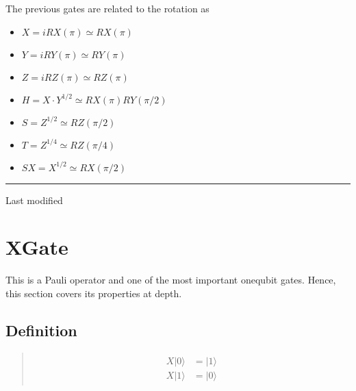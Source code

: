 \documentclass[letterpaper,10pt,english]{jupyterBook}
\begin{document}
\sphinxAtStartPar
The previous gates are related to the rotation as
\begin{itemize}
\item {}
\sphinxAtStartPar
\(X = i RX(\pi) \simeq RX(\pi)\)

\item {}
\sphinxAtStartPar
\(Y = i RY(\pi) \simeq RY(\pi)\)

\item {}
\sphinxAtStartPar
\(Z = i RZ(\pi) \simeq RZ(\pi)\)

\item {}
\sphinxAtStartPar
\(H = X \cdot Y^{1/2} \simeq RX(\pi) RY(\pi/2)\)

\item {}
\sphinxAtStartPar
\(S = Z^{1/2} \simeq RZ(\pi/2)\)

\item {}
\sphinxAtStartPar
\(T = Z^{1/4} \simeq RZ(\pi/4)\)

\item {}
\sphinxAtStartPar
\(SX = X^{1/2} \simeq RX(\pi/2)\)

\end{itemize}


\bigskip\hrule\bigskip


\sphinxAtStartPar
Last modified

\sphinxstepscope


\section{XGate}
\label{\detokenize{q1gates/x:xgate}}\label{\detokenize{q1gates/x:sec-xgate}}\label{\detokenize{q1gates/x::doc}}
\sphinxAtStartPar
This is a Pauli operator and one of the most important one\sphinxhyphen{}qubit gates.  Hence, this section covers its properties at depth.

\sphinxAtStartPar
{}


\subsection{Definition}
\label{\detokenize{q1gates/x:definition}}
\sphinxAtStartPar
{}
\begin{quote}
\begin{equation}\label{equation:q1gates/x:XGate}
\begin{split}
\begin{align}
X |0\rangle &= |1\rangle\\
X |1\rangle &= |0\rangle
\end{align}
\end{split}
\end{equation}\end{quote}
\end{document}
